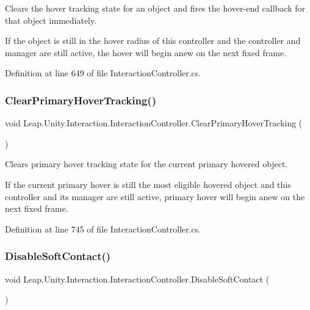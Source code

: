 Clears the hover tracking state for an object and fires the hover-\/end callback for that object immediately. 

If the object is still in the hover radius of this controller and the controller and manager are still active, the hover will begin anew on the next fixed frame. 

Definition at line 649 of file Interaction\+Controller.\+cs.

\mbox{\label{class_leap_1_1_unity_1_1_interaction_1_1_interaction_controller_a023df36bea05721df061204ea1e3fc65}} 
\subsubsection{\texorpdfstring{ClearPrimaryHoverTracking()}{ClearPrimaryHoverTracking()}}
{\footnotesize\ttfamily void Leap.\+Unity.\+Interaction.\+Interaction\+Controller.\+Clear\+Primary\+Hover\+Tracking (\begin{DoxyParamCaption}{ }\end{DoxyParamCaption})}



Clears primary hover tracking state for the current primary hovered object. 

If the current primary hover is still the most eligible hovered object and this controller and its manager are still active, primary hover will begin anew on the next fixed frame. 

Definition at line 745 of file Interaction\+Controller.\+cs.

\mbox{\label{class_leap_1_1_unity_1_1_interaction_1_1_interaction_controller_a4eb0f0252af42b94cc6ec92d02e365af}} 
\subsubsection{\texorpdfstring{DisableSoftContact()}{DisableSoftContact()}}
{\footnotesize\ttfamily void Leap.\+Unity.\+Interaction.\+Interaction\+Controller.\+Disable\+Soft\+Contact (\begin{DoxyParamCaption}{ }\end{DoxyParamCaption})}



